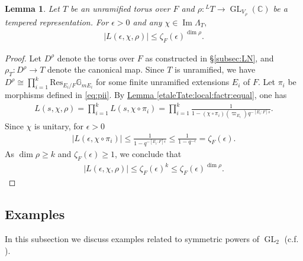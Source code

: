 \documentclass[10pt]{amsart}
\newtheorem{lemma}[theorem]{Lemma}
\theoremstyle{definition}
\numberwithin{equation}{section}
\DeclareMathOperator{\GL}{\mathrm{GL}}
\numberwithin{equation}{subsection}
\newcommand{\Ind}{\mathrm{Ind}}
\newcommand{\CC}{\mathbb{C}}
\renewcommand{\Im}{\mathop{\mathrm{Im}}}
\newenvironment{psmatrix}
  {\left(\begin{smallmatrix}}
  {\end{smallmatrix}\right)}
\begin{document}
\begin{lemma} Let $T$ be an unramified torus over $F$ and $\rho:{}^LT\to \GL_{V_\rho}(\CC)$ be a tempered representation. For $\epsilon>0$ and any $\chi\in\Im\Lambda_T,$
\begin{align*}
    |L(\epsilon,\chi,\rho)| \leq \zeta_F(\epsilon)^{\dim \rho}.
\end{align*}

\end{lemma}
\begin{proof} Let $D^\rho$ denote the torus over $F$ as constructed in \S\ref{subsec:LN}, and $\rho_T:D^\rho\to T$ denote the canonical map. Since $T$ is unramified, we have $D^\rho \cong \prod\limits_{i=1}^k\mathrm{Res}_{E_i/F}\mathbb{G}_{mE_i}$ for some finite unramified extensions $E_i$ of $F$. Let $\pi_i$ be morphisms defined in  \eqref{eq:pii}. By \hyperref[etaleTate:local:factr:equal]{Lemma \ref{etaleTate:local:factr:equal}}, one has 
\begin{align*}
    L(s,\chi,\rho) = \prod_{i=1}^k L(s,\chi\circ \pi_i)= \prod_{i=1}^k\frac{1}{1-(\chi\circ \pi_i)(\varpi_{E_i})q^{-[E_i:F]s}}.
\end{align*}
Since $\chi$ is unitary, for $\epsilon>0$ 
\begin{align*}
    |L(\epsilon,\chi\circ \pi_i)| \leq \frac{1}{1-q^{-[E_i:F]\epsilon}} \leq \frac{1}{1-q^{-\epsilon}}=\zeta_F(\epsilon).
\end{align*}
As $\dim\rho\geq k$ and $\zeta_F(\epsilon)\geq 1$, we conclude that
\begin{align*}
    |L(\epsilon,\chi,\rho)|\le \zeta_F(\epsilon)^k \le \zeta_F(\epsilon)^{\dim \rho}.
\end{align*}
\end{proof}


\subsection{Examples}\label{ssec:example} 

In this subsection we discuss examples related to symmetric powers of $\GL_2$ (c.f. \cite{BKNtriples}). 


\end{document}

